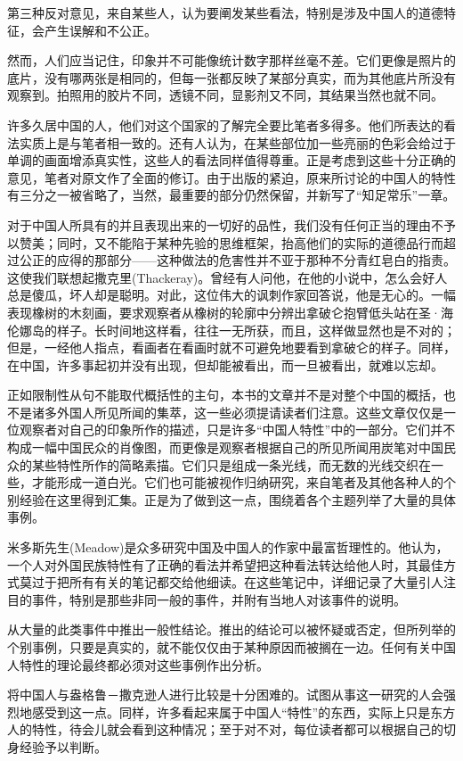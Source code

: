 \documentclass[12pt,oneside]{book}
\begin{document}
\begin{common-format}
第三种反对意见，来自某些人，认为要阐发某些看法，特别是涉及中国人的道德特征，会产生误解和不公正。 

然而，人们应当记住，印象并不可能像统计数字那样丝毫不差。它们更像是照片的底片，没有哪两张是相同的，但每一张都反映了某部分真实，而为其他底片所没有观察到。拍照用的胶片不同，透镜不同，显影剂又不同，其结果当然也就不同。 

许多久居中国的人，他们对这个国家的了解完全要比笔者多得多。他们所表达的看法实质上是与笔者相一致的。还有人认为，在某些部位加一些亮丽的色彩会给过于单调的画面增添真实性，这些人的看法同样值得尊重。正是考虑到这些十分正确的意见，笔者对原文作了全面的修订。由于出版的紧迫，原来所讨论的中国人的特性有三分之一被省略了，当然，最重要的部分仍然保留，并新写了“知足常乐”一章。 

对于中国人所具有的并且表现出来的一切好的品性，我们没有任何正当的理由不予以赞美；同时，又不能陷于某种先验的思维框架，抬高他们的实际的道德品行而超过公正的应得的那部分——这种做法的危害性并不亚于那种不分青红皂白的指责。这使我们联想起撒克里(Thackeray)。曾经有人问他，在他的小说中，怎么会好人总是傻瓜，坏人却是聪明。对此，这位伟大的讽刺作家回答说，他是无心的。一幅表现橡树的木刻画，要求观察者从橡树的轮廓中分辨出拿破仑抱臂低头站在圣·海伦娜岛的样子。长时间地这样看，往往一无所获，而且，这样做显然也是不对的；但是，一经他人指点，看画者在看画时就不可避免地要看到拿破仑的样子。同样，在中国，许多事起初并没有出现，但却能被看出，而一旦被看出，就难以忘却。 

正如限制性从句不能取代概括性的主句，本书的文章并不是对整个中国的概括，也不是诸多外国人所见所闻的集萃，这一些必须提请读者们注意。这些文章仅仅是一位观察者对自己的印象所作的描述，只是许多“中国人特性”中的一部分。它们并不构成一幅中国民众的肖像图，而更像是观察者根据自己的所见所闻用炭笔对中国民众的某些特性所作的简略素描。它们只是组成一条光线，而无数的光线交织在一些，才能形成一道白光。它们也可能被视作归纳研究，来自笔者及其他各种人的个别经验在这里得到汇集。正是为了做到这一点，围绕着各个主题列举了大量的具体事例。 

米多斯先生(Meadow)是众多研究中国及中国人的作家中最富哲理性的。他认为，一个人对外国民族特性有了正确的看法并希望把这种看法转达给他人时，其最佳方式莫过于把所有有关的笔记都交给他细读。在这些笔记中，详细记录了大量引人注目的事件，特别是那些非同一般的事件，并附有当地人对该事件的说明。 

从大量的此类事件中推出一般性结论。推出的结论可以被怀疑或否定，但所列举的个别事例，只要是真实的，就不能仅仅由于某种原因而被搁在一边。任何有关中国人特性的理论最终都必须对这些事例作出分析。 

将中国人与盎格鲁－撒克逊人进行比较是十分困难的。试图从事这一研究的人会强烈地感受到这一点。同样，许多看起来属于中国人“特性”的东西，实际上只是东方人的特性，待会儿就会看到这种情况；至于对不对，每位读者都可以根据自己的切身经验予以判断。 


\end{common-format}
\end{document}
